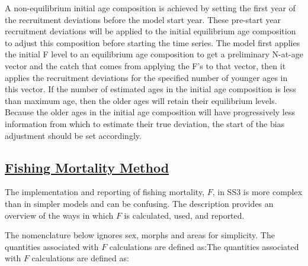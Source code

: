 
A non-equilibrium initial age composition is achieved by setting the first year of the recruitment deviations before the model start year. These pre-start year recruitment deviations will be applied to the initial equilibrium age composition to adjust this composition before starting the time series. The model first applies the initial F level to an equilibrium age composition to get a preliminary N-at-age vector and the catch that comes from applying the F's to that vector, then it applies the recruitment deviations for the specified number of younger ages in this vector. If the number of estimated ages in the initial age composition is less than maximum age, then the older ages will retain their equilibrium levels. Because the older ages in the initial age composition will have progressively less information from which to estimate their true deviation, the start of the bias adjustment should be set accordingly.

\hypertarget{FMethod}{}
\subsection[Fishing Mortality Method]{\protect\hyperlink{FMethod}{Fishing Mortality Method}}
The implementation and reporting of fishing mortality, $F$, in SS3 is more complex than in simpler models and can be confusing. The description provides an overview of the ways in which $F$ is calculated, used, and reported.


The nomenclature below ignores sex, morphs and areas for simplicity. The quantities associated with $F$ calculations are defined as:The quantities associated with $F$ calculations are defined as:

